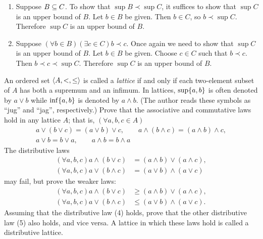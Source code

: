\begin{solution}
\begin{enumerate}[label=(\roman*)]
    \item Suppose $B\subseteq C$. To show that $\sup B \prec \sup C$, it suffices to show that $\sup C$
    is an upper bound of $B$. Let $b\in B$ be given. Then $b\in C$, so $b\prec \sup C$.
    Therefore $\sup C$ is an upper bound of $B$.

    \item Suppose $(\forall b\in B)(\exists c\in C)b\prec c$. Once again we need
    to show that $\sup C$ is an upper bound of $B$. Let $b\in B$ be given.
    Choose $c\in C$ such that $b\prec c$. Then $b\prec c\prec \sup C$.
    Therefore $\sup C$ is an upper bound of $B$.
\end{enumerate}
\end{solution}

\begin{exercise}
An ordered set $\left\langle A, <, \leq\right\rangle$ is called a \textit{lattice} if and only if each two-element subset
of $A$ has both a supremum and an infimum. In lattices, $\sup\set{a,b}$ is often denoted by
$a\vee b$ while $\inf\set{a, b}$ is denoted by $a\wedge b$. (The author reads these symbols as ``jug''
and ``jag'', respectively.) Prove that the associative and commutative laws hold in any
lattice $A$; that is, $(\forall a,b,c\in A)$
\begin{gather*}
    a\vee (b\vee c) = (a\vee b)\vee c,\qquad a\wedge (b\wedge c) = (a\wedge b)\wedge c,\\
    a\vee b = b\vee a,\qquad a\wedge b = b \wedge a
\end{gather*}
The distributive laws
\begin{align*}
    (\forall a,b,c) a\wedge (b\vee c) &= (a\wedge b) \vee (a\wedge c),\tag{4}\\
    (\forall a,b,c) a\vee (b\wedge c) &= (a\vee b) \wedge (a\vee c) \tag{5}
\end{align*}
may fail, but prove the weaker laws:
\begin{align*}
    (\forall a,b,c) a\wedge (b\vee c) &\geq (a\wedge b) \vee (a\wedge c),\\
    (\forall a,b,c) a\vee (b\wedge c) &\leq (a\vee b) \wedge (a\vee c).
\end{align*}
Assuming that the distributive law (4) holds, prove that the other distributive law (5)
also holds, and vice versa. A lattice in which these laws hold is called a distributive lattice.
\end{exercise}

